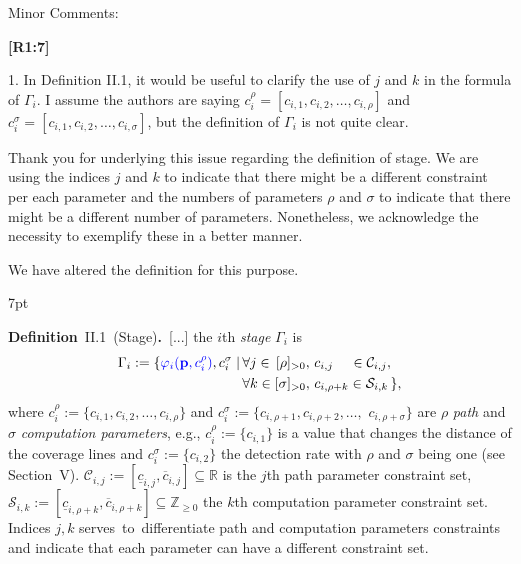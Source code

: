 \documentclass[10pt]{letter}
\newenvironment{formal}{%
  \def\FrameCommand{%
    \hspace{1pt}%
    {\color{red}\vrule width 2pt}%
    {\color{formalshade}\vrule width 4pt}%
    \colorbox{formalshade}%
  }%
  \MakeFramed{\advance\hsize-\width\FrameRestore}%
  \noindent\hspace{-4.55pt}%
  \begin{adjustwidth}{}{7pt}%
  \vspace{2pt}\vspace{2pt}%
}
{%
  \vspace{2pt}\end{adjustwidth}\endMakeFramed%
}
\begin{document}
\vspace{2em}


Minor Comments:

{\hspace*{-4.5em}\textbf{[R1:7]}\vspace*{-1.9em}}

1. In Definition II.1, it would be useful to clarify the use of $j$ and $k$ in the formula of $\Gamma_i$. I assume the authors are saying $c^\rho_i=[c_{i,1},c_{i,2},\dots,c_{i,\rho}]$ and $c^\sigma_i=[c_{i,1},c_{i,2},\dots,c_{i,\sigma}]$, but the definition of $\Gamma_i$ is not quite clear.

{\color{blue} 

{\hspace*{-4.5em}{[R1:7]}\vspace*{-1.9em}}

Thank you for underlying this issue regarding the definition of stage. We are using the indices $j$ and $k$ to indicate that there might be a different constraint per each parameter and the numbers of parameters $\rho$ and $\sigma$ to indicate that there might be a different number of parameters. Nonetheless, we acknowledge the necessity to exemplify these in a better manner.

We have altered the definition for this purpose.

\begin{formal}
  \color{black} 
  \textbf{Definition}~II.1~(Stage)\textbf{.}~[...] the $i$th \emph{stage} $\Gamma_i$ %
    is
  \begin{equation*}\begin{split}
      \Gamma_i:=\{{\color{blue}\varphi_i(\mathbf{p}%
      ,c_i^\rho)},c_i^\sigma\mid
      \,&\forall j\in\,[\rho]_{>0},\,c_{i,j}\,\,\,\,\,\,\,\in\mathcal{C}_{i,j},\,\\
        &\forall k\in[\sigma]_{>0},\,c_{i,\rho+k}\in\mathcal{S}_{i,k}\,\},
  \end{split}\end{equation*}
  where $c_i^\rho${\color{blue}$:=\{c_{i,1},c_{i,2},\dots,c_{i,\rho}\}$} and $c_i^\sigma${\color{blue}$:=\{c_{i,\rho+1},c_{i,\rho+2},\dots,$ $c_{i,\rho+\sigma}\}$} are $\rho$ \emph{path} and $\sigma$ \emph{computation parameters}{\color{blue}, e.g., $c_i^\rho:=\{c_{i,1}\}$ is a value that changes the distance of the coverage lines and $c^\sigma_i:=\{c_{i,2}\}$ the detection rate with $\rho$ and $\sigma$ being one (see Section~{\color{red}V})}. $\mathcal{C}_{i,j}:=[\underline{c}_{i,j},\overline{c}_{i,j}]\subseteq\mathbb{R}$ is the $j$th path parameter %
  constraint set, %
  $\mathcal{S}_{i,k}:=[\underline{c}_{i,\rho+k},\overline{c}_{i,\rho+k}]\subseteq\mathbb{Z}_{\geq 0}$ %
  the $k$th computation parameter constraint set. {\color{blue}Indices $j,k$ serves~to~differentiate path and computation parameters constraints and indicate that each parameter can have a different constraint set.}
  \vspace*{1ex}
\end{formal}

}
\end{document}
